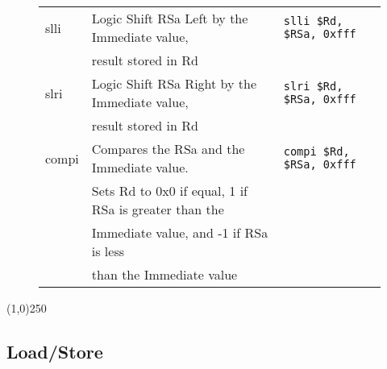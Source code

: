 \documentclass[letterpaper, 11pt]{article}
\begin{document}
\begin{figure}[!h]
\begin{center}
\begin{tabular}{|l|l|l|}
			slli				& Logic Shift RSa Left by the Immediate value, 							& \texttt{slli \$Rd, \$RSa, 0xfff}	\\ 	
			\hfill				& result stored in Rd													& \hfill 							\\ \hline				
			slri				& Logic Shift RSa Right by the Immediate value, 						& \texttt{slri \$Rd, \$RSa, 0xfff}	\\ 	
			\hfill				& result stored in Rd													& \hfill 							\\ \hline				
			compi				& Compares the RSa and the Immediate value. 							& \texttt{compi \$Rd, \$RSa, 0xfff}	\\
			\hfill				& Sets Rd to 0x0 if equal, 1 if RSa is greater than the					& \hfill							\\
			\hfill				& Immediate value, and -1 if RSa is less								& \hfill							\\
			\hfill				& than the Immediate value												& \hfill 							\\ \hline
		\end{tabular} 
	\end{center}
	
\end{figure}


\begin{center}
	\line(1,0){250}
\end{center}
\clearpage
\subsection{Load/Store}
\end{document}
